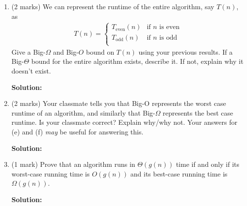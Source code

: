 \documentclass[a4,13pt]{extarticle}
\newenvironment{Solution}{\color{blue}\textbf{Solution:}}{}
\begin{document}
\begin{enumerate}
\begin{enumerate}
	      	      	      	                  
	      	\item (2 marks) We can represent the runtime of the entire algorithm, say $T(n)$, as
	      	      \begin{align*}
	      	      	T(n)=\begin{cases}
	      	      	T_{\text{even}}(n) & \text{if $n$ is even} \\
	      	      	T_{\text{odd}}(n)  & \text{if $n$ is odd}  \\
	      	      	\end{cases}
	      	      \end{align*}
	      	      Give a Big-$\Omega$ and Big-$O$ bound on $T(n)$ using your previous results. If a Big-$\Theta$ bound for the entire algorithm exists, describe it. If not, explain why it doesn’t exist.
	      	      
	      	\begin{Solution}
	      	\end{Solution}
	      	      	      	                  
	      	\item (2 marks) Your classmate tells you that Big-O represents the worst case runtime of an algorithm, and similarly that 
	      	      Big-$\Omega$ represents the best case runtime. Is your classmate correct? Explain why/why not. 
	      	      Your answers for (e) and (f) \textit{may} be useful for answering this.
	      	      
	      	\begin{Solution}
	      	\end{Solution}
	      	      	      	                  
	      	\item (1 mark) Prove that an algorithm runs in $\Theta (g(n))$ time if and only if its worst-case running time 
	      	      is $O(g(n))$ and its best-case running time is $\Omega(g(n))$.
	      	      
	      	\begin{Solution}
	      	\end{Solution}
	      	      	      	                  
	      \end{enumerate}
	      	          
	      \newpage 
	      	

\end{enumerate}
\end{document}
